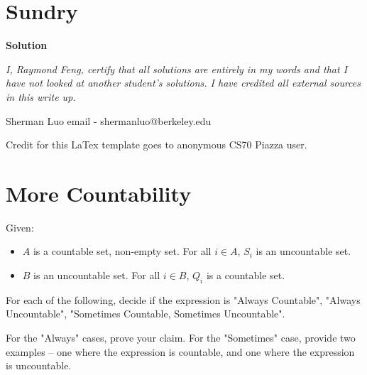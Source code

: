 \documentclass[11pt]{article}
\newcommand*{\Question}[1]{\section{#1}}
\begin{document}
\Question{Sundry} 
\vspace{10pt}
\begin{mdframed} \textbf{Solution} 
\item \textit {I, Raymond Feng, certify that all solutions are entirely in my words and that I have not looked at another student's solutions. I have credited all external sources in this write up.}
\item Sherman Luo email - shermanluo@berkeley.edu
\item Credit for this LaTex template goes to anonymous CS70 Piazza user.
\end{mdframed}
\vfill\pagebreak[3]

\Question{More Countability}

Given:
\begin{itemize}
\item $A$ is a countable set, non-empty set. For all $i \in A$, $S_i$ is an uncountable set.
\item $B$ is an uncountable set. For all $i \in B$, $Q_i$ is a countable set.
\end{itemize}

For each of the following, decide if the expression is
"Always Countable", "Always Uncountable", "Sometimes Countable,
Sometimes Uncountable".

For the "Always" cases, prove your claim. For the "Sometimes" case, provide
two examples -- one where the expression is countable, and one where
the expression is uncountable.
\end{document}

